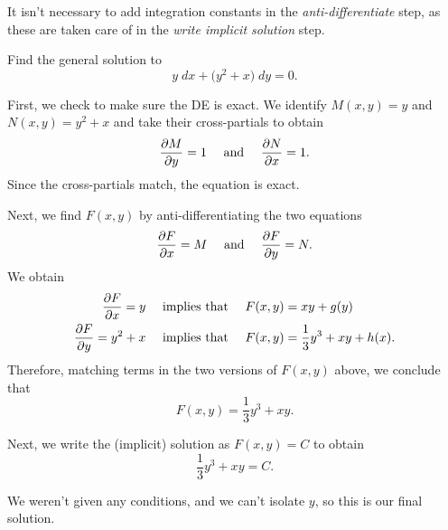 \documentclass{book}
\begin{document}
\begin{heads}
  It isn't necessary to add integration constants in the
  \emph{anti-differentiate} step, as these are taken care of in the
  \emph{write implicit solution} step.
\end{heads}

\newpage
\begin{easyexample}
  Find the general solution to
  \begin{equation*}
    y \;dx + \bigl( y^2 + x \bigr) \;dy = 0.
  \end{equation*}
\end{easyexample}

\begin{solution}

  First, we check to make sure the DE is exact.  We identify $M(x,y) =
  y$ and $N(x,y) = y^2 + x$ and take their cross-partials to obtain
  \begin{equation*}
    \frac{\partial M}{\partial y} = 1 \quad \text{ and } \quad \frac{\partial N}{\partial x} = 1.
  \end{equation*}
  Since the cross-partials match, the equation is exact.


  Next, we find $F(x,y)$ by anti-differentiating the two equations
  \begin{equation*}
    \frac{\partial F}{\partial x} = M \quad \text{ and } \quad \frac{\partial F}{\partial y} = N.
  \end{equation*}
  We obtain
  \begin{align*}
    \frac{\partial F}{\partial x} = y \quad \text{ implies that } \quad F(x,y) &= xy + g(y) \\
    \frac{\partial F}{\partial y} = y^2 + x \quad \text{ implies that } \quad F(x,y) &= \frac{1}{3} y^3 + xy + h(x).
  \end{align*}
  Therefore, matching terms in the two versions of $F(x,y)$ above, we
  conclude that
  \begin{equation*}
    F(x,y) = \frac{1}{3} y^3 + xy.
  \end{equation*}


  Next, we write the (implicit) solution as $F(x,y) = C$ to obtain
  \begin{equation*}
    \frac{1}{3} y^3 + xy = C.
  \end{equation*}

  We weren't given any conditions, and we can't isolate $y$, so this
  is our final solution.
\end{solution}
\end{document}
